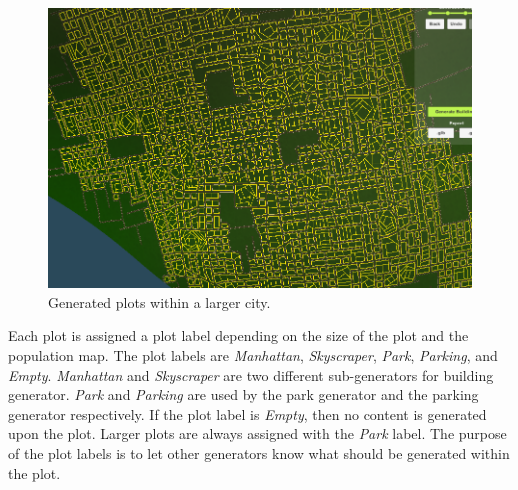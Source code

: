 \begin{figure}[H]
\begin{minipage}[b][][b]{.545\textwidth}
\begin{minipage}[b][][b]{0.90\textwidth}
      \includegraphics[width=\textwidth]{figure/plot.png}
      \caption{Generated plots within a larger city.}
      \label{fig:plot}
    \end{minipage}
  \end{minipage}
\end{figure}

Each plot is assigned a plot label depending on the size of the plot and the population map.
The plot labels are \textit{Manhattan}, \textit{Skyscraper}, \textit{Park}, \textit{Parking}, and \textit{Empty}.
\textit{Manhattan} and \textit{Skyscraper} are two different sub-generators for building generator. 
\textit{Park} and \textit{Parking} are used by the park generator and the parking generator respectively.
If the plot label is \textit{Empty}, then no content is generated upon the plot.
Larger plots are always assigned with the \textit{Park} label.
The purpose of the plot labels is to let other generators know what should be generated within the plot.

\pagebreak
